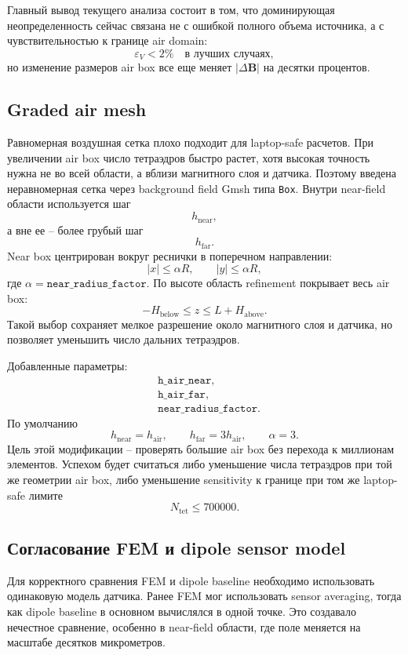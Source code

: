 \documentclass[12pt,a4paper]{article}
\begin{document}
Главный вывод текущего анализа состоит в том, что доминирующая неопределенность
сейчас связана не с ошибкой полного объема источника, а с чувствительностью к
границе air domain:
\[
    \varepsilon_V < 2\% \quad \text{в лучших случаях},
\]
но изменение размеров air box все еще меняет \(|\Delta\mathbf B|\) на десятки
процентов.

\subsection*{Graded air mesh}

Равномерная воздушная сетка плохо подходит для laptop-safe расчетов. При
увеличении air box число тетраэдров быстро растет, хотя высокая точность нужна
не во всей области, а вблизи магнитного слоя и датчика. Поэтому введена
неравномерная сетка через background field Gmsh типа \texttt{Box}. Внутри
near-field области используется шаг
\[
    h_{\mathrm{near}},
\]
а вне ее -- более грубый шаг
\[
    h_{\mathrm{far}}.
\]
Near box центрирован вокруг реснички в поперечном направлении:
\[
    |x|\le \alpha R,\qquad |y|\le \alpha R,
\]
где \(\alpha=\texttt{near\_radius\_factor}\). По высоте область refinement
покрывает весь air box:
\[
    -H_{\mathrm{below}}\le z\le L+H_{\mathrm{above}}.
\]
Такой выбор сохраняет мелкое разрешение около магнитного слоя и датчика, но
позволяет уменьшить число дальних тетраэдров.

Добавленные параметры:
\[
\begin{aligned}
&\texttt{h\_air\_near},\\
&\texttt{h\_air\_far},\\
&\texttt{near\_radius\_factor}.
\end{aligned}
\]
По умолчанию
\[
    h_{\mathrm{near}} = h_{\mathrm{air}},\qquad
    h_{\mathrm{far}} = 3h_{\mathrm{air}},\qquad
    \alpha = 3.
\]
Цель этой модификации -- проверять большие air box без перехода к миллионам
элементов. Успехом будет считаться либо уменьшение числа тетраэдров при той же
геометрии air box, либо уменьшение sensitivity к границе при том же laptop-safe
лимите
\[
    N_{\mathrm{tet}}\le 700000.
\]

\subsection*{Согласование FEM и dipole sensor model}

Для корректного сравнения FEM и dipole baseline необходимо использовать
одинаковую модель датчика. Ранее FEM мог использовать sensor averaging, тогда
как dipole baseline в основном вычислялся в одной точке. Это создавало
нечестное сравнение, особенно в near-field области, где поле меняется на
масштабе десятков микрометров.
\end{document}
